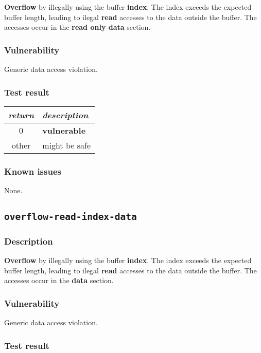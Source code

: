 \documentclass[a4paper]{book}
\begin{document}
\textbf{Overflow} by illegally using the buffer \textbf{index}.
The index exceeds the expected buffer length,
leading to ilegal \textbf{read} accesses to the data outside the buffer.
The accesses occur in the \textbf{read only data} section.

\subsubsection{Vulnerability}
Generic data access violation.

\subsubsection{Test result}

\begin{tabular}{cl}
  \toprule
  \emph{return}  & \emph{description} \\
  \midrule
  0              & \textbf{vulnerable} \\
  other          & might be safe \\
  \bottomrule
\end{tabular}

\subsubsection{Known issues}

None.

\newpage

\subsection{\texttt{overflow-read-index-data}}\label{test-overflow-read-index-data}

\subsubsection{Description}

\textbf{Overflow} by illegally using the buffer \textbf{index}.
The index exceeds the expected buffer length,
leading to ilegal \textbf{read} accesses to the data outside the buffer.
The accesses occur in the \textbf{data} section.

\subsubsection{Vulnerability}
Generic data access violation.

\subsubsection{Test result}
\end{document}
